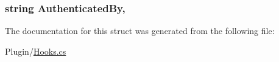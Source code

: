 \subsubsection[{Authenticated\+By}]{\setlength{\rightskip}{0pt plus 5cm}string Authenticated\+By\hspace{0.3cm}{\ttfamily [get]}, {\ttfamily [set]}}\label{structOTA_1_1Plugin_1_1HookArgs_1_1PlayerAuthenticationChanging_a285fa2c208fa2471fb593dfd2f95329c}


The documentation for this struct was generated from the following file\+:\begin{DoxyCompactItemize}
\item 
Plugin/\hyperlink{Hooks_8cs}{Hooks.\+cs}\end{DoxyCompactItemize}
